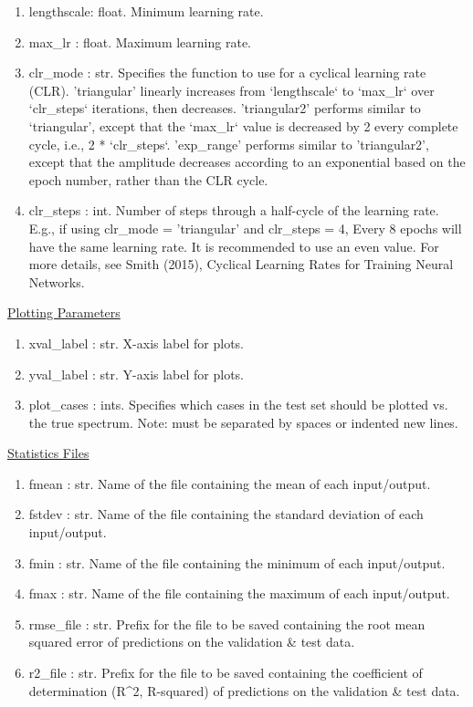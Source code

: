 \documentclass[letterpaper, 12pt]{article}
\begin{document}
\begin{enumerate}
\item lengthscale: float. Minimum learning rate.
\item max_lr     : float. Maximum learning rate.
\item clr_mode   : str.   Specifies the function to use for a cyclical learning rate 
                    (CLR).
                    'triangular' linearly increases from `lengthscale` to 
                    `max_lr` over `clr_steps` iterations, then decreases.
                    'triangular2' performs similar to `triangular', except that 
                    the `max_lr` value is decreased by 2 every complete cycle,
                    i.e., 2 * `clr_steps`.
                    'exp_range' performs similar to 'triangular2', except that 
                    the amplitude decreases according to an exponential based 
                    on the epoch number, rather than the CLR cycle.
\item clr_steps  : int.   Number of steps through a half-cycle of the learning rate.
                    E.g., if using clr_mode = 'triangular' and clr_steps = 4, 
                    Every 8 epochs will have the same learning rate.
                    It is recommended to use an even value.
                    For more details, see Smith (2015), Cyclical Learning Rates 
                    for Training Neural Networks.
\end{enumerate}

\noindent \underline{Plotting Parameters}
\begin{enumerate}
\item xval_label : str.  X-axis label for plots.
\item yval_label : str.  Y-axis label for plots.
\item plot_cases : ints. Specifies which cases in the test set should be 
                   plotted vs. the true spectrum.
                   Note: must be separated by spaces or indented new lines.
\end{enumerate}

\noindent \underline{Statistics Files}
\begin{enumerate}
\item fmean      : str.  Name of the file containing the mean of each input/output.
\item fstdev     : str.  Name of the file containing the standard deviation of each 
                   input/output.
\item fmin       : str.  Name of the file containing the minimum of each input/output.
\item fmax       : str.  Name of the file containing the maximum of each input/output.
\item rmse_file  : str.  Prefix for the file to be saved containing the root mean 
                   squared error of predictions on the validation & test data.
\item r2_file    : str.  Prefix for the file to be saved containing the coefficient of
                   determination (R^2, R-squared) of predictions on the 
                   validation & test data.
\end{enumerate}
\end{document}
